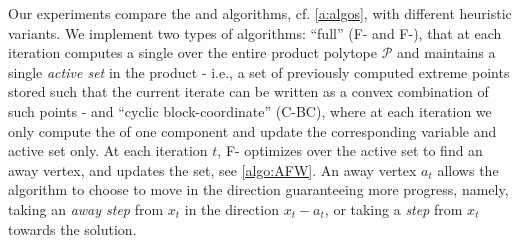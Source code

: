 \documentclass[twoside]{article}
\newcommand{\mP}{\mathcal{P}}
\begin{document}
Our experiments compare the \FW{} and \AFW{} algorithms, cf. \cref{a:algos}, with different heuristic variants. 
We implement two types of algorithms: ``full'' (F-\FW{} and F-\AFW{}), that at each iteration computes a single \LMO{} over the entire product polytope $\mP$ and maintains a single \emph{active set} in the product - i.e., a set of previously computed extreme points stored such that the current iterate can be written as a convex combination of such points - and ``cyclic block-coordinate'' (C-BC), where at each iteration we only compute the \LMO{} of one component and update the corresponding variable and active set only.
At each iteration $t$, F-\AFW{} optimizes over the active set to find an away vertex, and updates the set, see \cref{algo:AFW}. 
An away vertex $a_t$ allows the algorithm to choose to move in the direction guaranteeing more progress, namely, taking an \emph{away step} from $x_t$ in the direction $x_t - a_t$, or taking a \emph{\FW{} step} from $x_t$ towards the \LMO{} solution.
\end{document}
